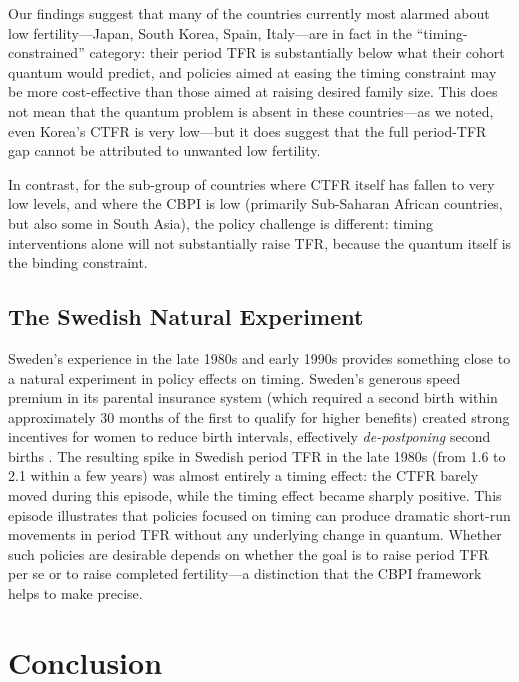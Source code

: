 \documentclass[12pt]{article}
\begin{document}
Our findings suggest that many of the countries currently most alarmed
about low fertility---Japan, South Korea, Spain, Italy---are in fact in
the ``timing-constrained'' category: their period TFR is substantially
below what their cohort quantum would predict, and policies aimed at
easing the timing constraint may be more cost-effective than those
aimed at raising desired family size.  This does not mean that the
quantum problem is absent in these countries---as we noted, even
Korea's CTFR is very low---but it does suggest that the full period-TFR
gap cannot be attributed to unwanted low fertility.

In contrast, for the sub-group of countries where CTFR itself has
fallen to very low levels, and where the CBPI is low (primarily
Sub-Saharan African countries, but also some in South Asia), the
policy challenge is different: timing interventions alone will not
substantially raise TFR, because the quantum itself is the binding
constraint.

\subsection{The Swedish Natural Experiment}

Sweden's experience in the late 1980s and early 1990s provides
something close to a natural experiment in policy effects on timing.
Sweden's generous speed premium in its parental insurance system
(which required a second birth within approximately 30 months of the
first to qualify for higher benefits) created strong incentives for
women to reduce birth intervals, effectively \emph{de-postponing}
second births \citep{Andersson2004,Hoem1993}.  The resulting spike in
Swedish period TFR in the late 1980s (from 1.6 to 2.1 within a few
years) was almost entirely a timing effect: the CTFR barely moved
during this episode, while the timing effect became sharply positive.
This episode illustrates that policies focused on timing can produce
dramatic short-run movements in period TFR without any underlying
change in quantum.  Whether such policies are desirable depends on
whether the goal is to raise period TFR per se or to raise completed
fertility---a distinction that the CBPI framework helps to make precise.

\section{Conclusion}
\label{sec:conclusion}
\end{document}
